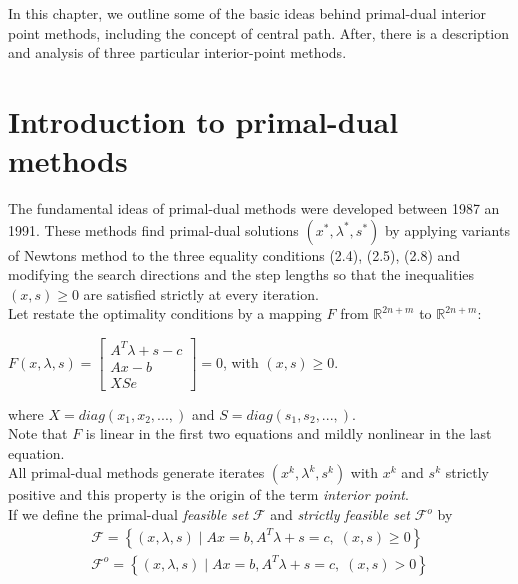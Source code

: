 \documentclass[a4paper,10 pt,titlepage,twoside]{book}
\theoremstyle{plain}
\theoremstyle{definition}
\theoremstyle{remark}
\begin{document}
In this chapter, we outline some of the basic ideas behind primal-dual interior point methods, including the concept of central path. After, there is a description and analysis of three particular interior-point methods.

\section{Introduction to primal-dual methods}
The fundamental ideas of primal-dual methods were developed between 1987 an 1991. 
These methods find primal-dual solutions $(x^{*},\lambda^{*},s^{*})$ by applying variants of Newtons method to the three equality conditions (2.4), (2.5), (2.8) and modifying the search directions and the step lengths so that the inequalities $(x,s)\geq0$ are satisfied strictly at every iteration.\\
 Let restate the optimality conditions by a mapping $\mathit{F}$ from $\mathbb{R}^{2n+m}$ to $\mathbb{R}^{2n+m}$:
\begin{center}
	$\mathit{F}(x,\lambda,s)= \begin{bmatrix}
	A^{T}\lambda+s-c \\Ax-b \\XSe
	\end{bmatrix}=0$, with $(x,s)\geq0.$
\end{center}
where $X = diag(x_{1}, x_{2},...,)$ and $S = diag(s_{1}, s_{2},...,)$.\\ Note that $\mathit{F}$ is linear in the first two equations and mildly nonlinear in the last equation. \\ All primal-dual methods generate iterates $(x^{k},\lambda^{k},s^{k})$ with $x^{k}$ and $s^{k}$ strictly positive and this property is the origin of the term \textit{interior point}.\\
If we define the primal-dual \textit{feasible set} $\mathcal{F}$ and \textit{strictly feasible set} $\mathcal{F}^{o}$ by
\begin{align*}
\mathcal{F} = \left\lbrace(x,\lambda,s)\;|\;Ax = b, A^{T}\lambda+s =c,\;(x,s)\geq0\right\rbrace \\
\mathcal{F}^{o} = \left\lbrace(x,\lambda,s)\;|\;Ax = b, A^{T}\lambda+s =c,\;(x,s)>0\right\rbrace 
\end{align*}
\end{document}
